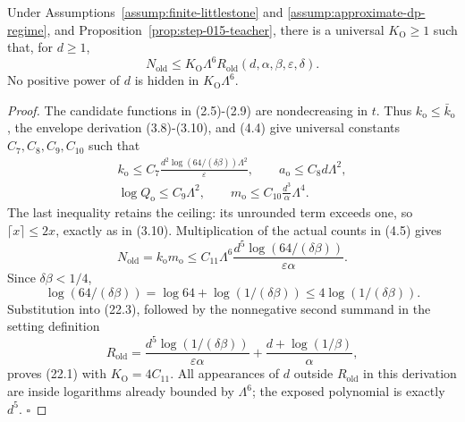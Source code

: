 \begin{proposition}\label{prop:step-015-rate}
Under Assumptions~\ref{assump:finite-littlestone} and
\ref{assump:approximate-dp-regime}, and
Proposition~\ref{prop:step-015-teacher}, there is a universal
\(K_{\mathrm O}\ge1\) such that, for \(d\ge1\),
\[
N_{\mathrm{old}}
\le K_{\mathrm O}\Lambda^6
R_{\mathrm{old}}(d,\alpha,\beta,\varepsilon,\delta).
\tag{22.1}
\]
No positive power of \(d\) is hidden in \(K_{\mathrm O}\Lambda^6\).


\end{proposition}

\begin{proof}
The candidate functions in (2.5)-(2.9) are nondecreasing in \(t\).
Thus \(k_{\mathrm o}\le\bar k_{\mathrm o}\), the envelope derivation
(3.8)-(3.10), and (4.4) give universal constants \(C_7,C_8,C_9,C_{10}\)
such that
\[
\begin{gathered}
k_{\mathrm o}\le
C_7\frac{d^2\log(64/(\delta\beta))\Lambda^2}{\varepsilon},
\qquad
a_{\mathrm o}\le C_8d\Lambda^2,\\
\log Q_{\mathrm o}\le C_9\Lambda^2,\qquad
m_{\mathrm o}\le
C_{10}\frac{d^3}{\alpha}\Lambda^4.
\end{gathered}
\tag{22.2}
\]
The last inequality retains the ceiling: its unrounded term exceeds one,
so \(\lceil x\rceil\le2x\), exactly as in (3.10).
Multiplication of the actual counts in (4.5) gives
\[
N_{\mathrm{old}}=k_{\mathrm o}m_{\mathrm o}
\le C_{11}\Lambda^6
\frac{d^5\log(64/(\delta\beta))}
{\varepsilon\alpha}.
\tag{22.3}
\]
Since \(\delta\beta<1/4\),
\[
\log(64/(\delta\beta))
=\log64+\log(1/(\delta\beta))
\le4\log(1/(\delta\beta)).
\tag{22.4}
\]
Substitution into (22.3), followed by the nonnegative second summand in
the setting definition
\[
R_{\mathrm{old}}
=\frac{d^5\log(1/(\delta\beta))}{\varepsilon\alpha}
+\frac{d+\log(1/\beta)}{\alpha},
\]
proves (22.1) with \(K_{\mathrm O}=4C_{11}\).
All appearances of \(d\) outside \(R_{\mathrm{old}}\) in this derivation
are inside logarithms already bounded by \(\Lambda^6\); the exposed
polynomial is exactly \(d^5\). \(\square\)


\end{proof}

